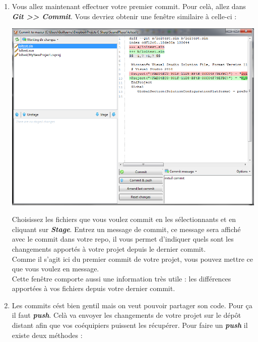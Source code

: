 \documentclass[a4paper]{article}
\begin{document}
\begin{enumerate}
     \item Vous allez maintenant effectuer votre premier commit. Pour celà,
	 allez dans \textbf{\emph{Git >> Commit}}. Vous devriez obtenir une fenêtre
	similaire à celle-ci : \\
	\begin{center}
	    \includegraphics[scale=0.58]{img/VS_commit.png}
	\end{center}
	Choisissez les fichiers que vous voulez commit en les sélectionnants
	et en cliquant sur \textbf{\emph{Stage}}. 
	Entrez un message de commit, ce message sera affiché avec le commit dans votre repo, il vous permet d'indiquer quels sont les changements apportés à votre projet depuis le dernier commit. \\

	Comme il s'agit ici du premier commit de votre projet, vous
pouvez mettre ce que vous voulez en message. \\

Cette fenêtre comporte aussi une
information très utile : les différences apportées à vos fichiers depuis
votre dernier commit.

\newpage

    \item Les commits cést bien gentil mais on veut pouvoir partager son
	code. Pour ça il faut \textbf{\emph{push}}. Celà va envoyer les changements de
	votre projet sur le dépôt distant afin que vos coéquipiers
	puissent les récupérer.
	Pour faire un \textbf{\emph{push}} il existe deux méthodes : \\
	
	\begin{itemize}


\end{itemize}
\end{enumerate}
\end{document}
